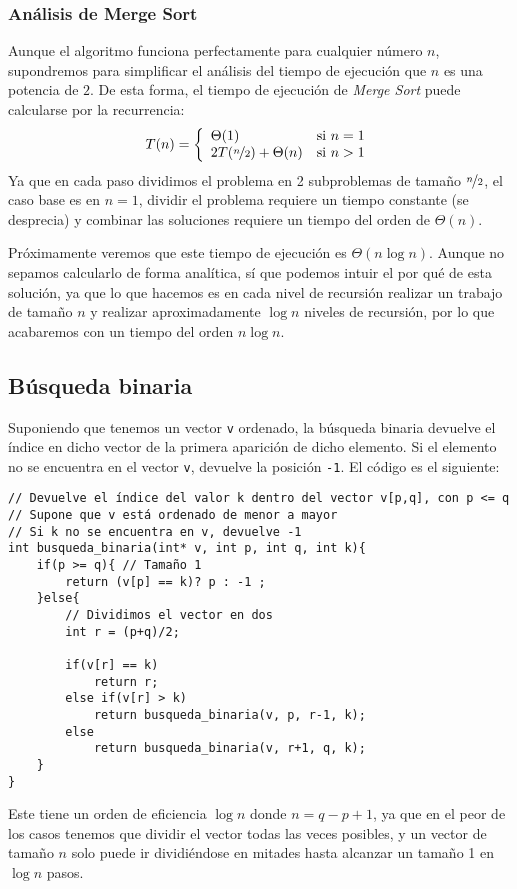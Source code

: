 \subsubsection{Análisis de Merge Sort}
Aunque el algoritmo funciona perfectamente para cualquier número $n$, supondremos para simplificar el análisis del tiempo de ejecución que $n$ es una potencia de $2$. De esta forma, el tiempo de ejecución de \textit{Merge Sort} puede calcularse por la recurrencia:
\begin{equation*}
    T(n) = \left\{\begin{array}{ll}
            \Theta(1) & \text{si\ } n=1 \\
            2T(\nicefrac{n}{2}) + \Theta(n) & \text{si\ } n > 1
    \end{array}\right.
\end{equation*}
Ya que en cada paso dividimos el problema en 2 subproblemas de tamaño $\nicefrac{n}{2}$, el caso base es en $n=1$, dividir el problema requiere un tiempo constante (se desprecia) y combinar las soluciones requiere un tiempo del orden de $\Theta(n)$.

Próximamente veremos que este tiempo de ejecución es $\Theta(n\log n)$. Aunque no sepamos calcularlo de forma analítica, sí que podemos intuir el por qué de esta solución, ya que lo que hacemos es en cada nivel de recursión realizar un trabajo de tamaño $n$ y realizar aproximadamente $\log n$ niveles de recursión, por lo que acabaremos con un tiempo del orden $n\log n$.

\subsection{Búsqueda binaria}
Suponiendo que tenemos un vector \texttt{v} ordenado, la búsqueda binaria devuelve el índice en dicho vector de la primera aparición de dicho elemento. Si el elemento no se encuentra en el vector \texttt{v}, devuelve la posición \texttt{-1}. El código es el siguiente:
\begin{verbatim}
// Devuelve el índice del valor k dentro del vector v[p,q], con p <= q
// Supone que v está ordenado de menor a mayor
// Si k no se encuentra en v, devuelve -1
int busqueda_binaria(int* v, int p, int q, int k){
    if(p >= q){ // Tamaño 1
        return (v[p] == k)? p : -1 ;
    }else{
        // Dividimos el vector en dos
        int r = (p+q)/2;

        if(v[r] == k)
            return r;
        else if(v[r] > k)
            return busqueda_binaria(v, p, r-1, k);
        else
            return busqueda_binaria(v, r+1, q, k);
    }
}
\end{verbatim}
Este tiene un orden de eficiencia $\log n$ donde $n = q-p+1$, ya que en el peor de los casos tenemos que dividir el vector todas las veces posibles, y un vector de tamaño $n$ solo puede ir dividiéndose en mitades hasta alcanzar un tamaño 1 en $\log n$ pasos.

